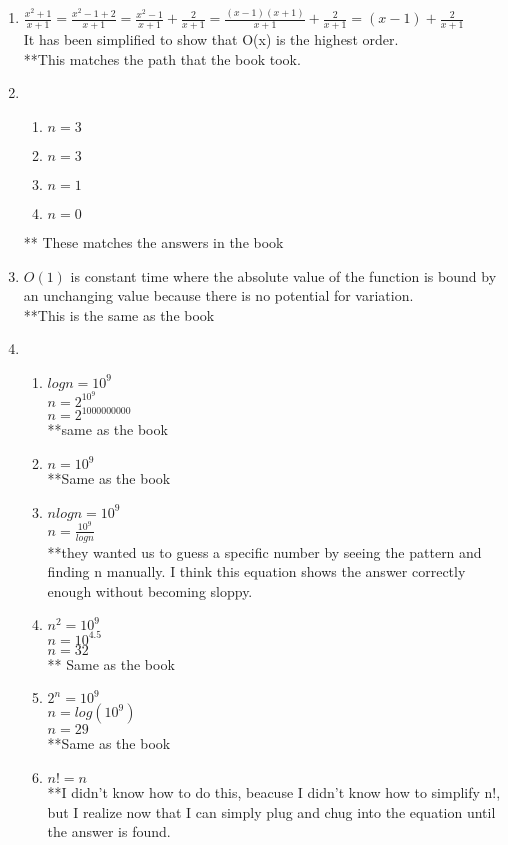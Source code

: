 \documentclass{article}
\begin{document}
\begin{enumerate}
\item $\frac{x^2+1}{x+1} = \frac{x^2-1+2}{x+1} = \frac{x^2-1}{x+1} + \frac{2}{x+1} = \frac{(x-1)(x+1)}{x+1} + \frac{2}{x+1} = (x-1) + \frac{2}{x+1}$ \\
 It has been simplified to show that O(x) is the highest order. \\
**This matches the path that the book took.

\item 
	\begin{enumerate}
	\item $n=3$
	\item $n=3$
	\item $n=1$
	\item $n=0$
	\end{enumerate}
	** These matches the answers in the book

\item $O(1)$ is constant time where the absolute value of the function is bound by an  unchanging value because there is no potential for variation. \\
	**This is the same as the book

\item
	\begin{enumerate}
	\item $log n = 10^9$ \\
				$n = 2^{10^9}$ \\
				$n = 2^1000000000$ \\
				**same as the book
	\item $n=10^9$ \\
				**Same as the book
	\item $nlogn = 10^9$ \\
				$n = \frac{10^9}{logn}$ \\
				**they wanted us to guess a specific number by seeing the pattern and finding n manually. I think this equation shows the answer correctly enough without becoming sloppy.
	\item $n^2 = 10^9$ \\
				$n = 10^4.5$ \\
				$n = 32$ \\
				** Same as the book
	\item $2^n = 10^9$ \\
				$n = log(10^9)$ \\
				$n = 29$ \\
				**Same as the book
	\item $n! = n$ \\
				**I didn't know how to do this, beacuse I didn't know how to simplify n!, but I realize now that I can simply plug and chug into the equation until the answer is found.
	\end{enumerate}


\end{enumerate}
\end{document}
